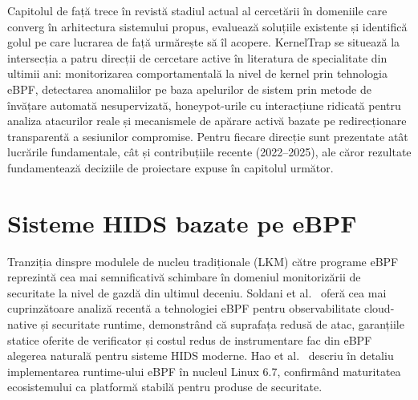 
Capitolul de față trece în revistă stadiul actual al cercetării în domeniile
care converg în arhitectura sistemului propus, evaluează soluțiile existente
și identifică golul pe care lucrarea de față urmărește să îl acopere. KernelTrap
se situează la intersecția a patru direcții de cercetare active în literatura de
specialitate din ultimii ani: monitorizarea comportamentală la nivel de kernel
prin tehnologia eBPF, detectarea anomaliilor pe baza apelurilor de sistem prin
metode de învățare automată nesupervizată, honeypot-urile cu interacțiune
ridicată pentru analiza atacurilor reale și mecanismele de apărare activă
bazate pe redirecționare transparentă a sesiunilor compromise. Pentru fiecare
direcție sunt prezentate atât lucrările fundamentale, cât și contribuțiile
recente (2022--2025), ale căror rezultate fundamentează deciziile de
proiectare expuse în capitolul următor.

\section{Sisteme HIDS bazate pe eBPF}

Tranziția dinspre modulele de nucleu tradiționale (LKM) către programe eBPF
reprezintă cea mai semnificativă schimbare în domeniul
monitorizării de securitate la nivel de gazdă din ultimul deceniu.
Soldani et al.~\cite{soldani2023ebpf} oferă cea mai cuprinzătoare analiză
recentă a tehnologiei eBPF pentru observabilitate cloud-native și securitate
runtime, demonstrând că suprafața redusă de atac, garanțiile statice oferite de
verificator și costul redus de instrumentare fac din eBPF alegerea naturală
pentru sisteme HIDS moderne.
Hao et al.~\cite{hao2024ebpfruntime} descriu în detaliu implementarea
runtime-ului eBPF în nucleul Linux 6.7, confirmând maturitatea ecosistemului ca
platformă stabilă pentru produse de securitate.

